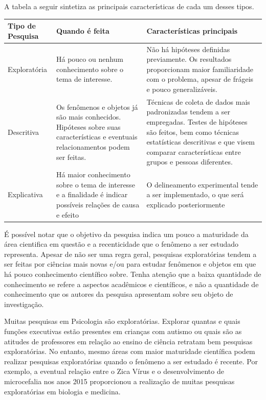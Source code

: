 \documentclass[
]{book}
\begin{document}
A tabela a seguir sintetiza as principais características de cada um desses tipos.

\begin{longtable}[]{@{}
  >{\raggedright\arraybackslash}p{}
  >{\raggedright\arraybackslash}p{}
  >{\raggedright\arraybackslash}p{}@{}}
\toprule
Tipo de Pesquisa & Quando é feita & Características principais \\
\midrule
\endhead
Exploratória & Há pouco ou nenhum conhecimento sobre o tema de interesse. & Não há hipóteses definidas previamente. Os resultados proporcionam maior familiaridade com o problema, apesar de frágeis e pouco generalizáveis. \\
Descritiva & Os fenômenos e objetos já são mais conhecidos. Hipóteses sobre suas características e eventuais relacionamentos podem ser feitas. & Técnicas de coleta de dados mais padronizadas tendem a ser empregadas. Testes de hipóteses são feitos, bem como técnicas estatísticas descritivas e que visem comparar características entre grupos e pessoas diferentes. \\
Explicativa & Há maior conhecimento sobre o tema de interesse e a finalidade é indicar possíveis relações de causa e efeito & O delineamento experimental tende a ser implementado, o que será explicado posteriormente \\
\bottomrule
\end{longtable}

É possível notar que o objetivo da pesquisa indica um pouco a maturidade da área cientifica em questão e a recenticidade que o fenômeno a ser estudado representa. Apesar de não ser uma regra geral, pesquisas exploratórias tendem a ser feitas por ciências mais novas e/ou para estudar fenômenos e objetos em que há pouco conhecimento científico sobre. Tenha atenção que a baixa quantidade de conhecimento se refere a aspectos acadêmicos e científicos, e não a quantidade de conhecimento que os autores da pesquisa apresentam sobre seu objeto de investigação.

Muitas pesquisas em Psicologia são exploratórias. Explorar quantas e quais funções executivas estão presentes em crianças com autismo \citep{Skogli2020} ou quais são as atitudes de professores em relação ao ensino de ciência \citep{Jones1994} retratam bem pesquisas exploratórias. No entanto, mesmo áreas com maior maturidade científica podem realizar pesquisas exploratórias quando o fenômeno a ser estudado é recente. Por exemplo, a eventual relação entre o Zica Vírus e o desenvolvimento de microcefalia nos anos 2015 proporcionou a realização de muitas pesquisas exploratórias em biologia e medicina.
\end{document}

